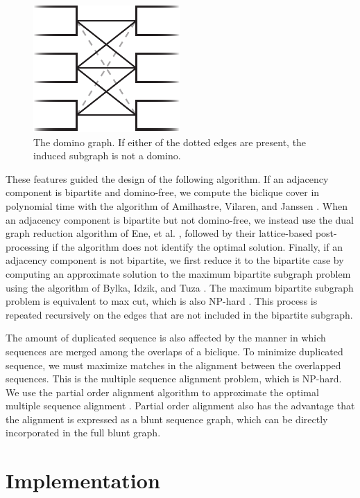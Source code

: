 \documentclass[11pt]{ucthesis}
\begin{document}
\begin{figure}
\begin{center}
\includegraphics[width=.2\textwidth]{bluntfigures/domino.pdf}
\caption{The domino graph. If either of the dotted edges are present, the induced subgraph is not a domino.} \label{fig:domino}
\end{center}
\end{figure}

These features guided the design of the following algorithm. If an adjacency component is bipartite and domino-free, we compute the biclique cover in polynomial time with the algorithm of Amilhastre, Vilaren, and Janssen \cite{amilhastre1998complexity}.
When an adjacency component is bipartite but not domino-free, we instead use the dual graph reduction algorithm of Ene, et al. \cite{ene2008fast}, followed by their lattice-based post-processing if the algorithm does not identify the optimal solution.
Finally, if an adjacency component is not bipartite, we first reduce it to the bipartite case by computing an approximate solution to the maximum bipartite subgraph problem using the algorithm of Bylka, Idzik, and Tuza \cite{bylka1999maximum}. 
The maximum bipartite subgraph problem is equivalent to max cut, which is also NP-hard \cite{karp1972reducibility}.
This process is repeated recursively on the edges that are not included in the bipartite subgraph.

The amount of duplicated sequence is also affected by the manner in which sequences are merged among the overlaps of a biclique.
To minimize duplicated sequence, we must maximize matches in the alignment between the overlapped sequences.
This is the multiple sequence alignment problem, which is NP-hard.
We use the partial order alignment algorithm to approximate the optimal multiple sequence alignment \cite{lee2002multiple}.
Partial order alignment also has the advantage that the alignment is expressed as a blunt sequence graph, which can be directly incorporated in the full blunt graph.

\section{Implementation}
\end{document}
